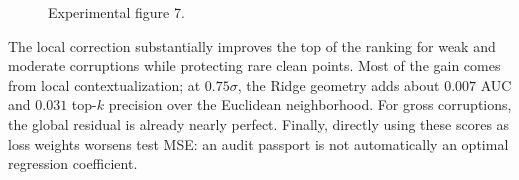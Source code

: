 \begin{figure}[htbp]
\centering{}
\caption{Experimental figure 7.}\label{fig:california}
\end{figure}

The local correction substantially improves the top of the ranking for weak and moderate corruptions while protecting rare clean points. Most of the gain comes from local contextualization; at $0.75\sigma$, the Ridge geometry adds about $0.007$ AUC and $0.031$ top-$k$ precision over the Euclidean neighborhood. For gross corruptions, the global residual is already nearly perfect. Finally, directly using these scores as loss weights worsens test MSE: an audit passport is not automatically an optimal regression coefficient.

